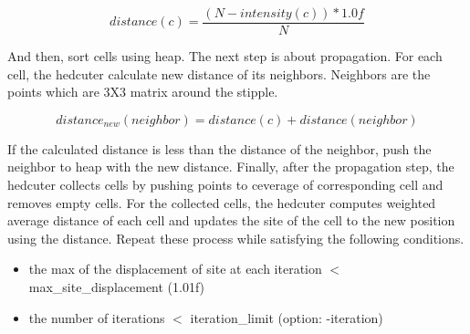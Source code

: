 \documentclass[11pt]{article}
\begin{document}
\begin{equation}
distance(c) = \frac{\left(N-intensity\left(c\right)\right)*1.0f}{N}
\label{eq:colortodist}
\end{equation}

And then, sort cells using heap. The next step is about propagation. For each cell, the hedcuter calculate new distance of its neighbors. Neighbors are the points which are 3X3 matrix around the stipple.

\begin{equation}
distance_{new}(neighbor) = distance(c) + distance(neighbor)
\label{eq:distance}
\end{equation}

If the calculated distance is less than the distance of the neighbor, push the neighbor to heap with the new distance. Finally, after the propagation step, the hedcuter collects cells by pushing points to ceverage of corresponding cell and removes empty cells. For the collected cells, the hedcuter computes weighted average distance of each cell and updates the site of the cell to the new position using the distance. Repeat these process while satisfying the following conditions.
\begin{itemize}
  \item the max of the displacement of site at each iteration  $<$ max\_site\_displacement (1.01f)
  \item the number of iterations $<$ iteration\_limit (option: -iteration)
\end{itemize}
\end{document}
